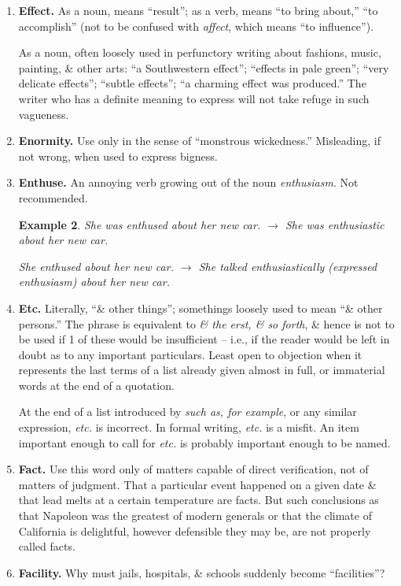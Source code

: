 \documentclass[oneside]{book}
\numberwithin{equation}{section}
\newtheorem{example}{Example}[chapter]
\begin{document}
\begin{enumerate}
	\begin{example}
		It should be a lesson to each \& every one of us. $\to$ It should be a lesson to every one of us (to us all).
	\end{example}
	\item \textbf{Effect.} As a noun, means ``result''; as a verb, means ``to bring about,'' ``to accomplish'' (not to be confused with \textit{affect}, which means ``to influence'').
	
	As a noun, often loosely used in perfunctory writing about fashions, music, painting, \& other arts: ``a Southwestern effect''; ``effects in pale green''; ``very delicate effects''; ``subtle effects''; ``a charming effect was produced.'' The writer who has a definite meaning to express will not take refuge in such vagueness.
	\item \textbf{Enormity.} Use only in the sense of ``monstrous wickedness.'' Misleading, if not wrong, when used to express bigness.
	\item \textbf{Enthuse.} An annoying verb growing out of the noun \textit{enthusiasm}. Not recommended.
	
	\begin{example}
		She was enthused about her new car. $\to$ She was enthusiastic about her new car.
		
		She enthused about her new car. $\to$ She talked enthusiastically (expressed enthusiasm) about her new car.
	\end{example}
	\item \textbf{Etc.} Literally, ``\& other things''; somethings loosely used to mean ``\& other persons.'' The phrase is equivalent to \textit{\& the erst, \& so forth}, \& hence is not to be used if 1 of these would be insufficient -- i.e., if the reader would be left in doubt as to any important particulars. Least open to objection when it represents the last terms of a list already given almost in full, or immaterial words at the end of a quotation.
	
	At the end of a list introduced by \textit{such as, for example}, or any similar expression, \textit{etc.} is incorrect. In formal writing, \textit{etc.} is a misfit. An item important enough to call for \textit{etc.} is probably important enough to be named.
	\item \textbf{Fact.} Use this word only of matters capable of direct verification, not of matters of judgment. That a particular event happened on a given date \& that lead melts at a certain temperature are facts. But such conclusions as that Napoleon was the greatest of modern generals or that the climate of California is delightful, however defensible they may be, are not properly called facts.
	\item \textbf{Facility.} Why must jails, hospitals, \& schools suddenly become ``facilities''?
	

\end{enumerate}
\end{document}
